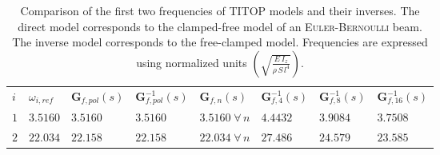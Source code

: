 \documentclass[smallcondensed]{svjour3}     %
\begin{document}
\begin{table}[htbp!]
\caption{Comparison of the first two frequencies of TITOP models and their inverses. The direct model corresponds to the clamped-free model of an \textsc{Euler-Bernoulli} beam. The inverse model corresponds to the free-clamped model. Frequencies are expressed using normalized units $\left(\sqrt{\frac{E\,I_z}{\rho\,S\,l^4}}\right)$.}
\label{tab:datac}       %
\begin{tabular}{llllllll}
\hline\noalign{\smallskip}
  $i$ & $\omega_{i,ref}$ &  $\mathbf{G}_{f,pol}(s)$ &  $\mathbf{G}_{f,pol}^{-1}(s)$ &  $\mathbf{G}_{f,n}(s)$ &  $\mathbf{G}_{f,4}^{-1}(s)$  &  $\mathbf{G}_{f,8}^{-1}(s)$ &  $\mathbf{G}_{f,16}^{-1}(s)$ \\
\noalign{\smallskip}\hline\noalign{\smallskip}
$1$ & $3.5160$ & $3.5160$ & $3.5160$ & $3.5160\;\forall\,n$ & $4.4432$ & $3.9084$ & $3.7508$\\ 
$2$ & $22.034$ & $22.158$ & $22.158$ & $22.034\;\forall\,n$ & $27.486$ & $24.579$ & $23.585$\\ 
\hline
\end{tabular}
\end{table}
\end{document}
